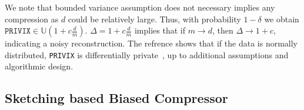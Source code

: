 \documentclass{article} %
\begin{document}
 We note that bounded variance assumption does not necessary implies any compression as $d$ could be relatively large. 
Thus, with probability $1-\delta$ we obtain  $\texttt{PRIVIX}\in \mathbb{U}(1+c\frac{d}{m})$.
 $\Delta=1+c\frac{d}{m}$ implies that if $m\rightarrow d$, then $\Delta\rightarrow 1+c$, indicating a noisy reconstruction. The refrence
 \cite{li2019privacy} shows that if the data is normally distributed, \texttt{PRIVIX} is differentially private~\citep{DBLP:conf/icalp/Dwork06}, up to additional assumptions and algorithmic design.  


\vspace{-0.05in}
\subsection{Sketching based Biased Compressor}
\vspace{-0.05in}
\end{document}
